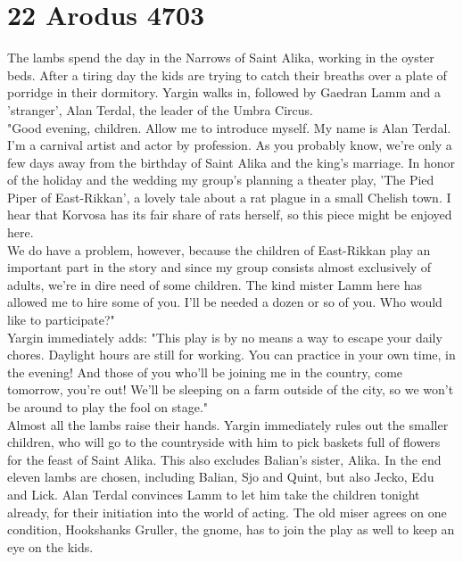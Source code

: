 \section{22 Arodus 4703}

The lambs spend the day in the Narrows of Saint Alika, working in the oyster beds. After a tiring day the kids are trying to catch their breaths over a plate of porridge in their dormitory. Yargin walks in, followed by Gaedran Lamm and a 'stranger', Alan Terdal, the leader of the Umbra Circus.\\

"Good evening, children. Allow me to introduce myself. My name is Alan Terdal. I'm a carnival artist and actor by profession. As you probably know, we're only a few days away from the birthday of Saint Alika and the king's marriage. In honor of the holiday and the wedding my group's planning a theater play, 'The Pied Piper of East-Rikkan', a lovely tale about a rat plague in a small Chelish town. I hear that Korvosa has its fair share of rats herself, so this piece might be enjoyed here.\\

We do have a problem, however, because the children of East-Rikkan play an important part in the story and since my group consists almost exclusively of adults, we're in dire need of some children. The kind mister Lamm here has allowed me to hire some of you. I'll be needed a dozen or so of you. Who would like to participate?"\\

Yargin immediately adds: "This play is by no means a way to escape your daily chores. Daylight hours are still for working. You can practice in your own time, in the evening! And those of you who'll be joining me in the country, come tomorrow, you're out! We'll be sleeping on a farm outside of the city, so we won't be around to play the fool on stage."\\

Almost all the lambs raise their hands. Yargin immediately rules out the smaller children, who will go to the countryside with him to pick baskets full of flowers for the feast of Saint Alika. This also excludes Balian's sister, Alika. In the end eleven lambs are chosen, including Balian, Sjo and Quint, but also Jecko, Edu and Lick. Alan Terdal convinces Lamm to let him take the children tonight already, for their initiation into the world of acting. The old miser agrees on one condition, Hookshanks Gruller, the gnome, has to join the play as well to keep an eye on the kids.\\

